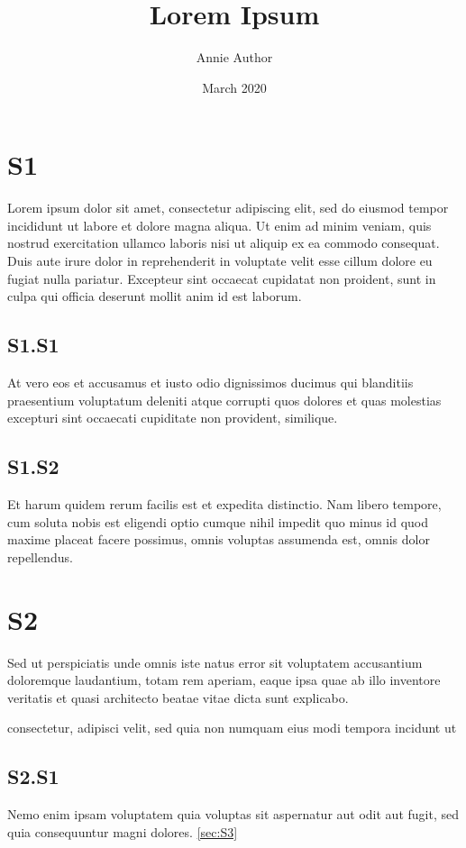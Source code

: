 \documentclass{article}
\title{Lorem Ipsum}
\author{Annie Author}
\date{March 2020}
\begin{document}
\maketitle

\section{S1}\label{sec:S1}

Lorem ipsum dolor sit amet, consectetur adipiscing elit, sed do eiusmod tempor incididunt ut labore et dolore magna aliqua. Ut enim ad minim veniam, quis nostrud exercitation ullamco laboris nisi ut aliquip ex ea commodo consequat. Duis aute irure dolor in reprehenderit in voluptate velit esse cillum dolore eu fugiat nulla pariatur. Excepteur sint occaecat cupidatat non proident, sunt in culpa qui officia deserunt mollit anim id est laborum.

\subsection{S1.S1}\label{sec:S1S1}

At vero eos et accusamus et iusto odio dignissimos ducimus qui blanditiis praesentium voluptatum deleniti atque corrupti quos dolores et quas molestias excepturi sint occaecati cupiditate non provident, similique.

\subsection{S1.S2}
Et harum quidem rerum facilis est et expedita distinctio. Nam libero tempore, cum soluta nobis est eligendi optio cumque nihil impedit quo minus id quod maxime placeat facere possimus, omnis voluptas assumenda est, omnis dolor repellendus.

\section{S2}

\label{sec:S2}

Sed ut perspiciatis unde omnis iste natus error sit voluptatem accusantium doloremque laudantium, totam rem aperiam, eaque ipsa quae ab illo inventore veritatis et quasi architecto beatae vitae dicta sunt explicabo.

consectetur, adipisci velit, sed quia non numquam eius modi tempora incidunt ut



\subsection{S2.S1}
Nemo enim ipsam voluptatem quia voluptas sit aspernatur aut odit aut fugit, sed quia consequuntur magni dolores. \ref{sec:S3}
\end{document}
